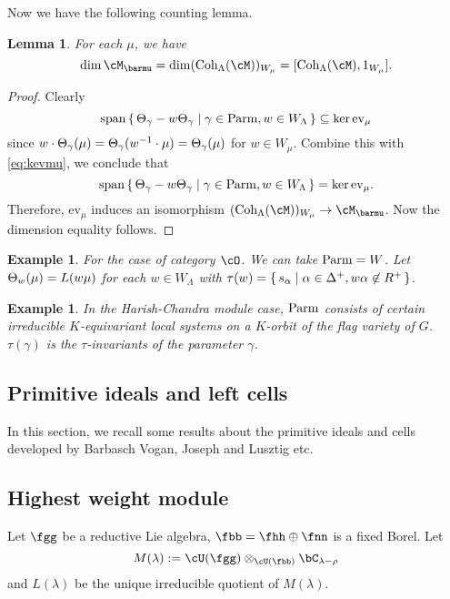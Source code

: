 \documentclass[12pt,a4paper]{amsart}
\makeatletter
\def\inn#1#2{\left\langle
      \def\ta{#1}\def\tb{#2}
      \ifx\ta\@empty{\;} \else {\ta}\fi ,
      \ifx\tb\@empty{\;} \else {\tb}\fi
      \right\rangle}
\numberwithin{equation}{section}
\newtheorem{lem}[thm]{Lemma}
\newtheorem{eg}[thm]{Example}
\theoremstyle{remark}
\DeclareMathOperator{\sspan}{span}
\def\Coh{\mathrm{Coh}}
\def\ev#1{{\mathrm{ev}_{#1}}}
\makeatother
\begin{document}
\def\cohm{\Coh_\Lambda(\cM)}
Now we have the following counting lemma.
\begin{lem}
 For each $\mu$, we have
 \[
    \dim \cM_{\barmu}  = \dim (\cohm)_{W_\mu} = [\cohm, 1_{W_\mu}].
 \]
\end{lem}
\begin{proof}
  Clearly
  \[
  \sspan\set{\cof_\gamma - w\cof_\gamma | \gamma\in \Parm, w\in W_\Lambda} \subseteq \ker \ev{\mu}
  \]
  since $w\cdot \Theta_\gamma(\mu) = \Theta_\gamma(w^{-1}\cdot \mu)=\Theta_\gamma(\mu)$ for $w\in W_\mu$.
  Combine this with \eqref{eq:kevmu}, we conclude that
  \[
   \sspan\set{\cof_\gamma - w\cof_\gamma | \gamma\in \Parm, w\in W_\Lambda} = \ker \ev{\mu}.
  \]
  Therefore, $\ev{\mu}$ induces an isomorphism $(\cohm)_{W_\mu}\rightarrow \cM_{\barmu}$.
  Now the dimension equality follows.
\end{proof}

\begin{eg}
  For the case of category $\cO$. We can take $\mathrm{Parm}  = W$.
  Let $\Theta_w(\mu) = L(w\mu)$ for each $w\in W_\Lambda$ with
  $\tau(w) = \set{s_\alpha |\alpha\in \Delta^+, w\alpha \not\in R^+ }$.
\end{eg}

\begin{eg}
 In the Harish-Chandra module case,
 $\mathrm{Parm}$ consists of certain irreducible $K$-equivariant local systems on a $K$-orbit of the flag variety of $G$.
 $\tau(\gamma)$ is the $\tau$-invariants of the parameter $\gamma$.
\end{eg}



\subsection{Primitive ideals and left cells}
In this section, we recall some results about the primitive ideals and cells developed by Barbasch Vogan, Joseph and Lusztig etc.

\subsection{Highest weight module}
Let $\fgg$ be a reductive Lie algebra, $\fbb = \fhh \oplus \fnn$ is a fixed Borel.
Let
\[
  M(\lambda)  := \cU(\fgg)\otimes_{\cU(\fbb)} \bC_{\lambda-\rho}
\]
and $L(\lambda) $ be the unique irreducible quotient of $M(\lambda)$.
\end{document}
